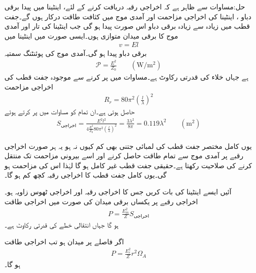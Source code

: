 حل:مساوات  سے ظاہر ہے کہ اخراجی رقبہ دریافت کرنے کے لئے، اینٹینا میں پیدا برقی دباو ، اینٹینا کی اخراجی مزاحمت  اور آمدی موج میں کثافت طاقت  درکار ہوں گے۔جفت قطب میں زیادہ سے زیادہ برقی دباو اس صورت پیدا ہو گی جب اینٹینا کی تار اور آمدی موج کا برقی میدان متوازی ہوں۔ایسی صورت میں اینٹینا میں
\begin{align}
v=E l
\end{align}
برقی دباو پیدا ہو گی۔آمدی موج کی پوئنٹنگ سمتیہ
\begin{align}
\mathscr{P}=\frac{E^2}{Z_0} \quad \quad (\si{\watt/ \meter \squared})
\end{align}
ہے جہاں  خلاء کی قدرتی رکاوٹ ہے۔مساوات  میں  پر کرنے سے موجودہ جفت قطب کی اخراجی مزاحمت
\begin{align}
R_r=80 \pi^2 \left(\frac{l}{\lambda}\right)^2
\end{align}
حاصل ہوتی ہے۔ان تمام کو مساوات  میں پر کرتے ہوئے
\begin{align}
S_{\text{اخراجی}} = \frac{E^2 l^2}{4 \frac{E^2}{Z_0} 80 \pi^2 \left(\frac{l}{\lambda}\right)^2  }=\frac{3\lambda^2}{8\pi}=0.119 \lambda^2 \quad \quad (\si{\meter \squared})
\end{align}

یوں کامل مختصر جفت قطب کی لمبائی جتنی بھی کم کیوں نہ ہو یہ ہر صورت  اخراجی رقبے پر آمدی موج سے تمام طاقت حاصل کرنے اور اسے بیرونی مزاحمت تک منتقل کرنے کی صلاحیت رکھتا ہے۔حقیقی جفت قطب غیر کامل ہو گا  لہٰذا اس کی مزاحمت  ہو گی۔یوں کامل جفت قطب کا اخراجی رقبہ کچھ کم ہو گا۔

آئیں ایسے اینٹینا کی بات کریں جس کا اخراجی رقبہ  اور اخراجی ٹھوس زاویہ  ہو۔اخراجی رقبے پر یکساں برقی میدان  کی صورت میں اخراجی طاقت
\begin{align}
P=\frac{E_m^2}{Z} S_{\text{اخراجی}}
\end{align}
ہو گا جہاں  انتقالی خطے کی قدرتی رکاوٹ ہے۔

اگر  فاصلے پر میدان  ہو تب اخراجی طاقت
\begin{align}
P=\frac{E_r^2}{Z} r^2 \Omega_A
\end{align}
ہو گا۔ 

